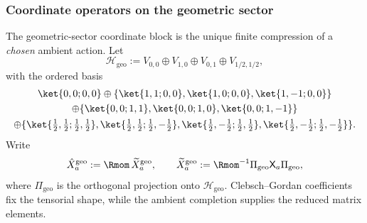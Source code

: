 \documentclass[11pt,a4paper]{article}
\begin{document}
\subsubsection{\texorpdfstring{Coordinate operators on the geometric sector}{Coordinate operators on the geometric sector}}
\label{p2:app:X_geo_block}

The geometric-sector coordinate block is the unique finite compression of a
\emph{chosen} ambient action.  Let
\[
\mathcal H_{\mathrm{geo}}:=V_{0,0}\oplus V_{1,0}\oplus V_{0,1}\oplus V_{1/2,1/2},
\]
with the ordered basis
\begin{multline*}
\ket{0,0;0,0} \oplus
\{\ket{1,1;0,0},\ket{1,0;0,0},\ket{1,-1;0,0}\} \\
\oplus \{\ket{0,0;1,1},\ket{0,0;1,0},\ket{0,0;1,-1}\} \\
\oplus \{\ket{\tfrac12,\tfrac12;\tfrac12,\tfrac12},\ket{\tfrac12,\tfrac12;\tfrac12,-\tfrac12},
\ket{\tfrac12,-\tfrac12;\tfrac12,\tfrac12},\ket{\tfrac12,-\tfrac12;\tfrac12,-\tfrac12}\}.
\end{multline*}
Write
\[
\hat X_a^{\mathrm{geo}}:=\Rmom\,\widetilde X_a^{\mathrm{geo}},
\qquad
\widetilde X_a^{\mathrm{geo}}:=\Rmom^{-1}\Pi_{\mathrm{geo}}\mathsf X_a\Pi_{\mathrm{geo}},
\]
where \(\Pi_{\mathrm{geo}}\) is the orthogonal projection onto
\(\mathcal H_{\mathrm{geo}}\).  Clebsch--Gordan coefficients fix the tensorial
shape, while the ambient completion supplies the reduced matrix elements.
\end{document}
